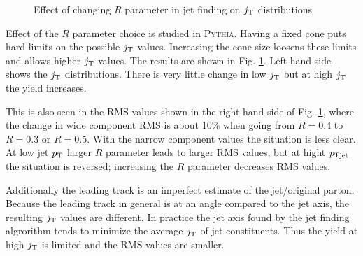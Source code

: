 \begin{figure}[htp]
\centering
{}
\caption[\textsc{Pythia} $R$ parameters $\jt{}$]{Effect of changing $R$ parameter in jet finding on $\jt{}$ distributions}
\label{fig:Rcomparison}
\end{figure}


Effect of the $R$ parameter choice is studied in \textsc{Pythia}. Having a fixed cone puts hard limits on the possible $\jt{}$ values. Increasing the cone size loosens these limits and allows higher $\jt{}$ values. The results are shown in Fig. \ref{fig:Rcomparison}. Left hand side shows the $\jt{}$ distributions. There is very little change in low $\jt{}$ but at high $\jt{}$ the yield increases. 

This is also seen in the RMS values shown in the right hand side of Fig. \ref{fig:Rcomparison}, where the change in wide component RMS is about 10\% when going from $R=0.4$ to $R=0.3$ or $R=0.5$. With the narrow component values the situation is less clear. At low jet $p_{\rm T}$ larger $R$ parameter leads to larger RMS values, but at hight $p_{\rm Tjet}$ the situation is reversed; increasing the $R$ parameter decreases RMS values.

Additionally the leading track is an imperfect estimate of the jet/original parton. Because the leading track in general is at an angle compared to the jet axis, the resulting $\jt{}$ values are different. In practice the jet axis found by the jet finding algrorithm tends to minimize the average $\jt{}$ of jet constituents. Thus the yield at high $\jt{}$ is limited and the RMS values are smaller.

